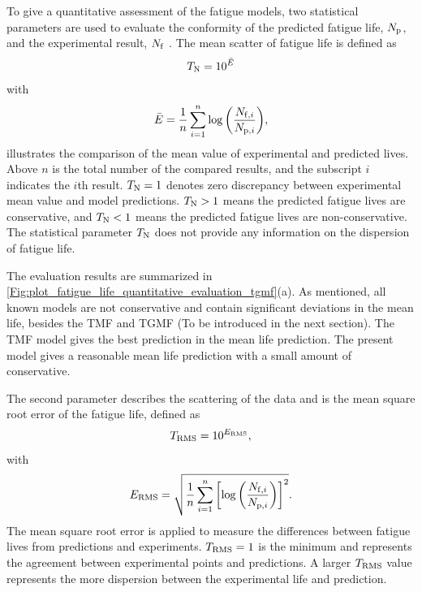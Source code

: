 \documentclass[preprint,5p,twocolumn,10pt,sort&compress]{elsarticle}
\begin{document}
To give a quantitative assessment of the fatigue models, two statistical parameters are used to evaluate the conformity of the predicted fatigue life, $N_{\rm p}$, and the experimental result, $N_{\rm f}$ \cite{KAROLCZUK201439, WALAT201473, SKIBICKI201718, SUN2019228}. 
The mean scatter of fatigue life is defined as
\begin{equation}\label{Equ:TN}
{T_{\rm N}} = {10^{\bar E}}
\end{equation}
with
\begin{equation}
\bar E = \frac{1}{n}\sum\limits_{i = 1}^n {\log \left( {\frac{{{N_{{\rm f},i}}}}{{{N_{{\rm p},i}}}}} \right)},
\end{equation}
{illustrates the comparison of the mean value of experimental and predicted lives. Above $n$ is the total number of the compared results, and the subscript $i$ indicates the $i$th result. $T_{\rm N} = 1$ denotes zero discrepancy between experimental mean value and model predictions. $T_{\rm N} > 1$ means the predicted fatigue lives are conservative, and $T_{\rm N} < 1$ means the predicted fatigue lives are non-conservative. The statistical parameter $T_{\rm N}$ does not provide any information on the dispersion of fatigue life.}

The evaluation results are summarized in \autoref{Fig:plot_fatigue_life_quantitative_evaluation_tgmf}(a). As mentioned, all known models are not conservative and contain significant deviations in the mean life, besides the TMF and TGMF (To be introduced in the next section). The TMF model gives the best prediction in the mean life prediction. The present model gives a reasonable mean life prediction with a small amount of conservative.

The second parameter describes the scattering of the data and is the mean square root error of the fatigue life, defined as
\begin{equation}\label{Equ:TRMS}
{T_{\rm RMS}} = {10^{{E_{\rm RMS}}}},
\end{equation}
with
\begin{equation}
{E_{\rm RMS}} = \sqrt {\frac{1}{n}\sum\limits_{i = 1}^n {\left[{{\log }}\left( {\frac{{{N_{{\rm f},i}}}}{{{N_{{\rm p},i}}}}} \right) \right]^2}}.
\end{equation}
{The mean square root error is applied to measure the differences between fatigue lives from predictions and experiments. $T_{\rm RMS} = 1$ is the minimum and represents the agreement between experimental points and predictions. A larger $T_{\rm RMS}$ value represents the more dispersion between the experimental life and prediction.}
\end{document}

